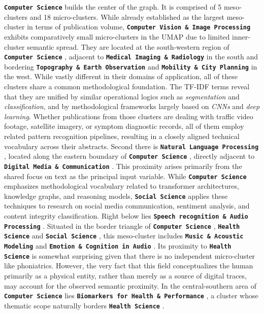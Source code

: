 \documentclass{article}
\begin{document}
	\textbf{\texttt{Computer Science}}  builds the center of the graph. It is comprised of 5 meso-clusters and 18 micro-clusters. While already established as the largest meso-cluster in terms of publication volume, \textbf{\texttt{Computer Vision \& Image Processing}}  exhibits comparatively small micro-clusters in the UMAP due to limited inner-cluster semantic spread. They are located at the south-western region of \textbf{\texttt{Computer Science}} , adjacent to \textbf{\texttt{Medical Imaging \& Radiology}}  in the south and bordering \textbf{\texttt{Topography \& Earth Observation}}  and \textbf{\texttt{Mobility \& City Planning}}  in the west. While vastly different in their domains of application, all of these clusters share a common methodological foundation. The TF-IDF terms reveal that they are unified by similar operational logics such as \textit{segmentation} and \textit{classification}, and by methodological frameworks largely based on \textit{CNNs} and \textit{deep learning}. Whether publications from those clusters are dealing with traffic video footage, satellite imagery, or symptom diagnostic records, all of them employ related pattern recognition pipelines, resulting in a closely aligned technical vocabulary across their abstracts. Second there is \textbf{\texttt{Natural Language Processing}} , located along the eastern boundary of \textbf{\texttt{Computer Science}} , directly adjacent to \textbf{\texttt{Digital Media \& Communication}} . This proximity arises primarily from the shared focus on text as the principal input variable. While \textbf{\texttt{Computer Science}}  emphasizes methodological vocabulary related to transformer architectures, knowledge graphs, and reasoning models, \textbf{\texttt{Social Science}}  applies these techniques to research on social media communication, sentiment analysis, and content integrity classification. Right below lies \textbf{\texttt{Speech recognition \& Audio Processing}} . Situated in the border triangle of \textbf{\texttt{Computer Science}} , \textbf{\texttt{Health Science}}  and \textbf{\texttt{Social Science}} , this meso-cluster includes \textbf{\texttt{Music \& Acoustic Modeling}}  and \textbf{\texttt{Emotion \& Cognition in Audio}} . Its proximity to \textbf{\texttt{Health Science}}  is somewhat surprising given that there is no independent micro-cluster like phoniatrics. However, the very fact that this field conceptualizes the human primarily as a physical entity, rather than merely as a source of digital traces, may account for the observed semantic proximity. In the central-southern area of \textbf{\texttt{Computer Science}}  lies \textbf{\texttt{Biomarkers for Health \& Performance}} , a cluster whose thematic scope naturally borders \textbf{\texttt{Health Science}} .
	
\end{document}
